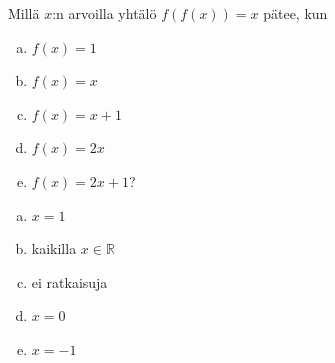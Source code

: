 \begin{tehtava}
Millä $x$:n arvoilla yhtälö $f(f(x)) = x$ pätee, kun
\begin{enumerate}[a)]
\item $f(x) = 1$
\item $f(x) = x$
\item $f(x) = x+1$
\item $f(x) = 2x$
\item $f(x) = 2x+1$?
\end{enumerate}
\begin{vastaus}
\begin{enumerate}[a)]
\item $x = 1$
\item kaikilla $x\in\mathbb{R}$
\item ei ratkaisuja
\item $x = 0$
\item $x = -1$
\end{enumerate}
\end{vastaus}
\end{tehtava}


